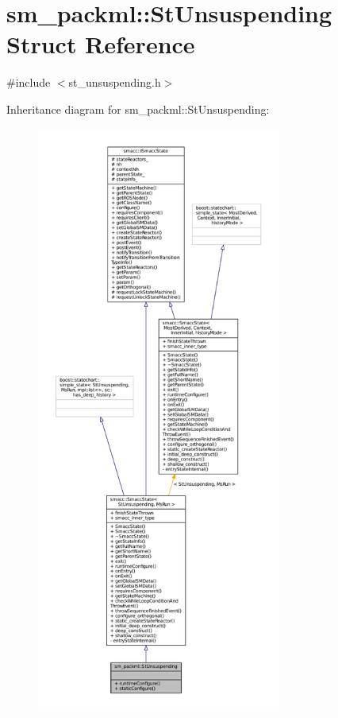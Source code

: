 \hypertarget{structsm__packml_1_1StUnsuspending}{}\section{sm\+\_\+packml\+:\+:St\+Unsuspending Struct Reference}
\label{structsm__packml_1_1StUnsuspending}


{\ttfamily \#include $<$st\+\_\+unsuspending.\+h$>$}



Inheritance diagram for sm\+\_\+packml\+:\+:St\+Unsuspending\+:
\nopagebreak
\begin{figure}[H]
\begin{center}
\leavevmode
\includegraphics[height=550pt]{structsm__packml_1_1StUnsuspending__inherit__graph}
\end{center}
\end{figure}


